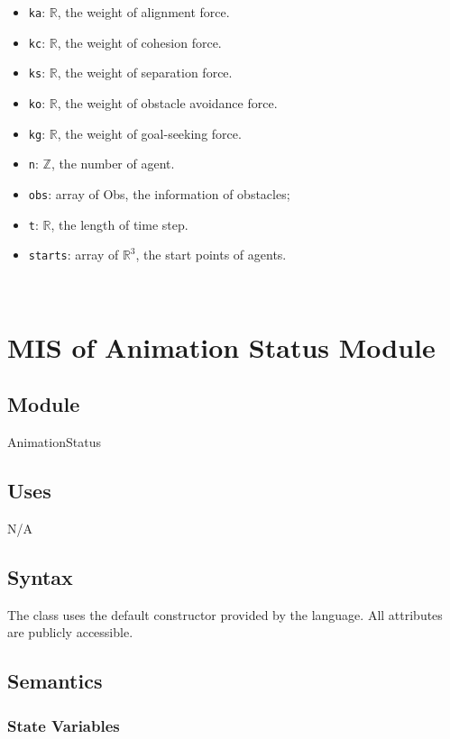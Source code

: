 \documentclass[12pt, titlepage]{article}
\begin{document}
\begin{itemize}
\item \texttt{ka}: $\mathbb{R}$, the weight of alignment force. 
\item \texttt{kc}: $\mathbb{R}$, the weight of cohesion force. 
\item \texttt{ks}: $\mathbb{R}$, the weight of separation force. 
\item \texttt{ko}: $\mathbb{R}$, the weight of obstacle avoidance force. 
\item \texttt{kg}: $\mathbb{R}$, the weight of goal-seeking force. 
\item \texttt{n}: $\mathbb{Z}$, the number of agent. 
\item \texttt{obs}: array of Obs, the information of obstacles;
\item \texttt{t}: $\mathbb{R}$, the length of time step. 
\item \texttt{starts}: array of $\mathbb{R}^3$, the start points of agents. 
\end{itemize}

~\newpage

\section{MIS of Animation Status Module} \label{mAS}

\subsection{Module}

AnimationStatus

\subsection{Uses}

N/A

\subsection{Syntax}

The class uses the default constructor provided by the language. All 
attributes are publicly accessible.

\subsection{Semantics}

\subsubsection{State Variables}
\end{document}

